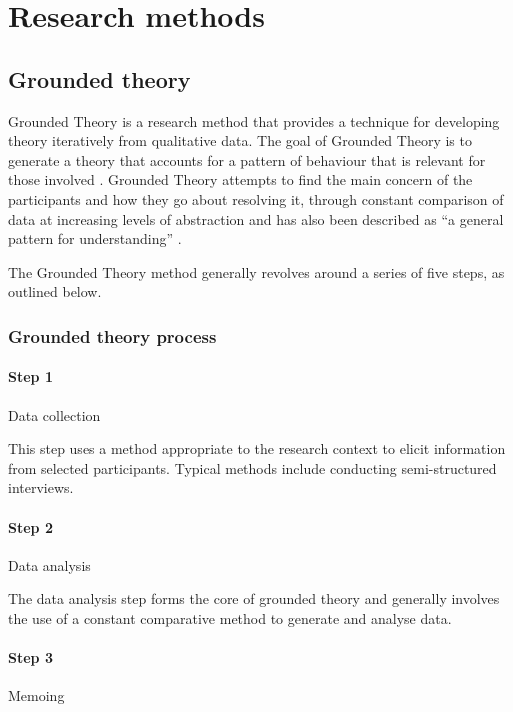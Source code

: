 \section{Research methods}
\label{sec:exploratory-study:research-methods}

\subsection{Grounded theory}
\label{sec:exploratory-study:grounded-theory}

Grounded Theory is a research method that provides a technique for developing
theory iteratively from qualitative data. The goal of Grounded Theory is to
generate a theory that accounts for a pattern of behaviour that is relevant for those involved \citep{Glaser1978}. Grounded Theory attempts to find the main concern of the participants and how they go about resolving it, through constant comparison of data at increasing levels of abstraction and has also been described as ``a general pattern for understanding'' \citep{Glaser1992}.

The Grounded Theory method generally revolves around a series of five
steps, as outlined below.

\subsubsection{Grounded theory process}

\paragraph{Step 1} Data collection

This step uses a method appropriate to the research context to elicit
information from selected participants. Typical methods include
conducting semi-structured interviews.

\paragraph{Step 2} Data analysis

The data analysis step forms the core of grounded theory and generally involves
the use of a constant comparative method to generate and analyse data.

\paragraph{Step 3} Memoing

